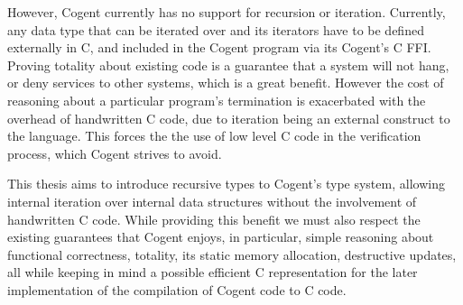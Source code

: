 However, Cogent currently has no support for recursion or iteration.
Currently, any data type that can be iterated over and its iterators have to be defined externally in C,
  and included in the Cogent program via its Cogent's C FFI.
Proving totality about existing code is a guarantee that a system will not hang,
  or deny services to other systems, which is a great benefit.
However the cost of reasoning about a particular program's termination is
  exacerbated with the overhead of handwritten C code, due to iteration being an external construct to the language.
This forces the the use of low level C code in the verification process, which Cogent strives to avoid.

This thesis aims to introduce recursive types to Cogent's type system, allowing internal iteration over
  internal data structures without the involvement of handwritten C code.
While providing this benefit we must also respect the existing guarantees that Cogent enjoys,
  in particular, simple reasoning about functional correctness, totality,
  its static memory allocation, destructive updates, all while keeping in mind
  a possible efficient C representation for the later implementation of the compilation of Cogent
  code to C code.